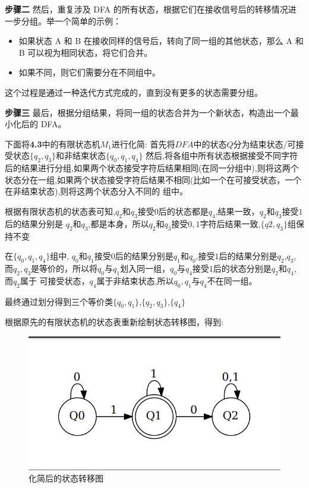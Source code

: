 \documentclass{article}
\begin{document}
    \textbf{步骤二}
    然后，重复涉及 DFA 的所有状态，根据它们在接收信号后的转移情况进一步分组。举一个简单的示例：
    \begin{itemize}
        \item 如果状态 A 和 B 在接收同样的信号后，转向了同一组的其他状态，那么 A 和 B 可以视为相同状态，将它们合并。
        \item 如果不同，则它们需要分在不同组中。
    \end{itemize}
    这个过程是通过一种迭代方式完成的，直到没有更多的状态需要分组。

    \textbf{步骤三}
    最后，根据分组结果，将同一组的状态合并为一个新状态，构造出一个最小化后的 DFA。
    

下面将\textbf{4.3}中的有限状态机$M_1$进行化简:
首先将$DFA$中的状态$Q$分为结束状态/可接受状态$\{q_2,q_3\}$和非结束状态$\{q_0,q_1,q_4\}$
然后,将各组中所有状态根据接受不同字符后的结果进行分组,如果两个状态接受字符后结果相同(在同一分组中),则将这两个
状态分在一组,如果两个状态接受字符后结果不相同(比如一个在可接受状态，一个在非结束状态),则将这两个状态分入不同的
组中。

根据有限状态机的状态表可知,$q_2$和$q_3$接受$0$后的状态都是$q_4$,结果一致，$q_2$和$q_3$接受$1$后的结果分别是
$q_2$和$q_3$,都是本身，所以$q_2$和$q_3$接受$0,1$字符后结果一致,$\{q2,q_3\}$组保持不变

在$\{q_0,q_1,q_4\}$组中, $q_0$和$q_1$接受$0$后的结果分别是$q_1$和$q_0$,接受$1$后的结果分别是$q_2$,$q_3$,
而$q_2,q_3$是等价的，所以将$q_0$与$q_1$划入同一组，$q_0$与$q_4$接受$1$后的状态分别是$q_2$和$q_4$, 而$q_2$属于
可接受状态，$q_4$属于非结束状态,所以$q_0,q_1$与$q_4$不在同一组。

最终通过划分得到三个等价类$\{q_0,q_1\}$,$\{q_2,q_3\}$,$\{q_4\}$

根据原先的有限状态机的状态表重新绘制状态转移图，得到:

\begin{figure}[h]
    \centering
    \includegraphics{../Img/minimized_dfa_example.png}
    \caption{化简后的状态转移图}
\end{figure}
\end{document}
